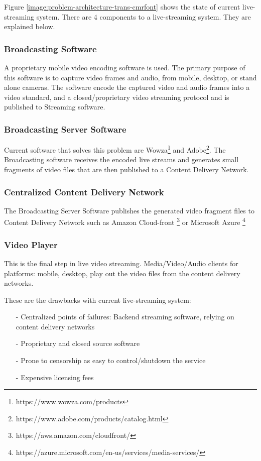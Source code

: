\documentclass{article}
\begin{document}
Figure \ref{image:problem-architecture-trans-cmrfont} shows the state of current live-streaming system. There are 4 components to a live-streaming system. They are explained below.
\subsubsection{Broadcasting Software}
A proprietary mobile video encoding software is used. The primary purpose of this software is to capture video frames and audio, from mobile, desktop, or stand alone cameras. The software encode the captured video and audio frames into a video standard, and a closed/proprietary video streaming protocol and is published to Streaming software.

\subsubsection{Broadcasting Server Software}
Current software that solves this problem are Wowza\footnote{https://www.wowza.com/products} and Adobe\footnote{https://www.adobe.com/products/catalog.html}. The Broadcasting software receives the encoded live streams and generates small fragments of video files that are then published to a Content Delivery Network.

\subsubsection{Centralized Content Delivery Network}
The Broadcasting Server Software publishes the generated video fragment files to Content Delivery Network such as Amazon Cloud-front \footnote{https://aws.amazon.com/cloudfront/} or Microsoft Azure \footnote{https://azure.microsoft.com/en-us/services/media-services/}

\subsubsection{Video Player}
This is the final step in live video streaming. Media/Video/Audio clients for platforms: mobile, desktop, play out the video files from the content delivery networks.


These are the drawbacks with current live-streaming system:
\begin{itemize}
 \item[-]Centralized points of failures: Backend streaming software, relying on content delivery networks
 \item[-]Proprietary and closed source software
 \item[-]Prone to censorship as easy to control/shutdown the service
 \item[-]Expensive licensing fees
\end{itemize}
\end{document}
